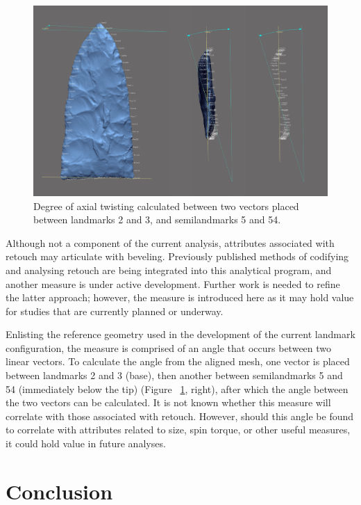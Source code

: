 \documentclass[review]{elsarticle}
\begin{document}
\begin{figure}[ht]\centering
\includegraphics[width=\linewidth]{gahagan-beveling.pdf}
\caption{Degree of axial twisting calculated between two vectors placed between landmarks 2 and 3, and semilandmarks 5 and 54.}
\label{fig:beveling}
\end{figure}

Although not a component of the current analysis, attributes associated with retouch may articulate with beveling. Previously published methods of codifying and analysing retouch \citep{RN4308,RN3854} are being integrated into this analytical program, and another measure is under active development. Further work is needed to refine the latter approach; however, the measure is introduced here as it may hold value for studies that are currently planned or underway.

Enlisting the reference geometry used in the development of the current landmark configuration, the measure is comprised of an angle that occurs between two linear vectors. To calculate the angle from the aligned mesh, one vector is placed between landmarks 2 and 3 (base), then another between semilandmarks 5 and 54 (immediately below the tip) (Figure ~\ref{fig:beveling}, right), after which the angle between the two vectors can be calculated. It is not known whether this measure will correlate with those associated with retouch. However, should this angle be found to correlate with attributes related to size, spin torque, or other useful measures, it could hold value in future analyses.

\section*{Conclusion}
\end{document}
